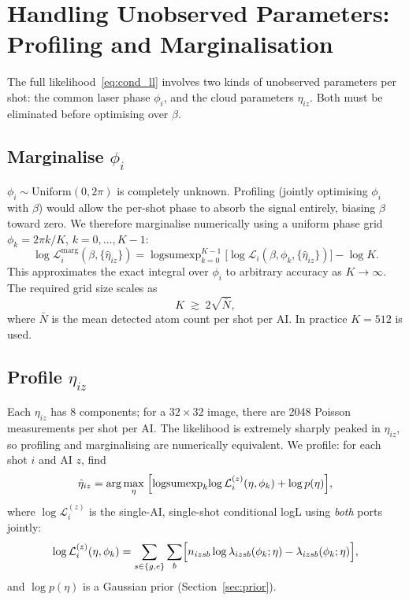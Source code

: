 \documentclass[11pt,a4paper]{article}
\newcommand{\Lcal}{\mathcal{L}}
\begin{document}
\section{Handling Unobserved Parameters: Profiling and Marginalisation}
\label{sec:nuisances}

The full likelihood~\eqref{eq:cond_ll} involves two kinds of unobserved parameters
per shot: the common laser phase $\phi_i$, and the cloud parameters $\eta_{iz}$.
Both must be eliminated before optimising over $\beta$.

\subsection{Marginalise $\phi_i$}

$\phi_i \sim \mathrm{Uniform}(0, 2\pi)$ is completely unknown.  Profiling
(jointly optimising $\phi_i$ with $\beta$) would allow the per-shot phase to
absorb the signal entirely, biasing $\hat\beta$ toward zero.  We therefore
marginalise numerically using a uniform phase grid
$\phi_k = 2\pi k / K$, $k = 0,\ldots,K-1$:
\begin{equation}
  \log\Lcal_i^\mathrm{marg}(\beta,\{\hat\eta_{iz}\})
  = \operatorname{logsumexp}_{k=0}^{K-1}
    \!\bigl[\log\Lcal_i(\beta,\phi_k,\{\hat\eta_{iz}\})\bigr]
    - \log K.
  \label{eq:lse}
\end{equation}
This approximates the exact integral over $\phi_i$ to arbitrary accuracy as
$K \to \infty$.  The required grid size scales as
\begin{equation}
  K \;\gtrsim\; 2\sqrt{\bar N},
  \label{eq:ntheta}
\end{equation}
where $\bar N$ is the mean detected atom count per shot per AI.  In practice
$K = 512$ is used.

\subsection{Profile $\eta_{iz}$}

Each $\eta_{iz}$ has 8 components; for a $32\times32$ image, there are 2048
Poisson measurements per shot per AI.  The likelihood is extremely sharply
peaked in $\eta_{iz}$, so profiling and marginalising are numerically
equivalent.  We profile: for each shot $i$ and AI $z$, find
\begin{equation}
  \hat\eta_{iz}
  = \arg\max_{\eta}\;
    \Bigl[
      \operatorname{logsumexp}_{k}\!\log\Lcal_i^{(z)}(\eta,\phi_k)
      + \log p(\eta)
    \Bigr],
  \label{eq:eta_profile}
\end{equation}
where $\log\Lcal_i^{(z)}$ is the single-AI, single-shot conditional logL
using \emph{both} ports jointly:
\begin{equation}
  \log\Lcal_i^{(z)}(\eta,\phi_k)
  = \sum_{s \in \{g,e\}} \sum_b
    \Bigl[
      n_{izsb} \log \lambda_{izsb}(\phi_k;\eta)
      - \lambda_{izsb}(\phi_k;\eta)
    \Bigr],
\end{equation}
and $\log p(\eta)$ is a Gaussian prior (Section~\ref{sec:prior}).
\end{document}
